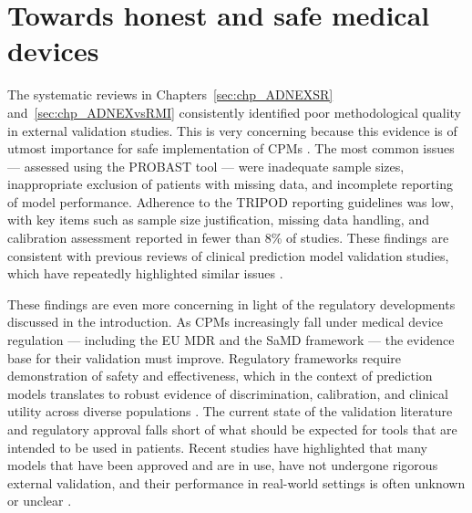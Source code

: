 \section{Towards honest and safe medical devices}

The systematic reviews in Chapters~\ref{sec:chp_ADNEXSR} and~\ref{sec:chp_ADNEXvsRMI} consistently identified poor methodological quality in external validation studies. This is very concerning because this evidence is of utmost importance for safe implementation of \glspl{CPM} \cite{steyerbergPredictionModelsNeed2016}.  The most common issues --- assessed using the \gls{PROBAST} tool \cite{wolffPROBASTToolAssess2019} --- were inadequate sample sizes, inappropriate exclusion of patients with missing data, and incomplete reporting of model performance. Adherence to the \gls{TRIPOD} reporting guidelines \cite{collinsTRIPODAIStatementUpdated2024} was low, with key items such as sample size justification, missing data handling, and calibration assessment reported in fewer than 8\% of studies. These findings are consistent with previous reviews of clinical prediction model validation studies, which have repeatedly highlighted similar issues \cite{collinsExternalValidationMultivariable2014, bouwmeesterReportingMethodsClinical2012, andaurnavarroCompletenessReportingClinical2022,andaurnavarroSystematicReviewFinds2023, andaurnavarroSystematicReviewIdentifies2023, dhimanMethodologicalConductPrognostic2022, dhimanOverinterpretationFindingsMachine2023}.

These findings are even more concerning in light of the regulatory developments discussed in the introduction. As \glspl{CPM} increasingly fall under medical device regulation --- including the EU \gls{MDR} and the \gls{SaMD} framework --- the evidence base for their validation must improve. Regulatory frameworks require demonstration of safety and effectiveness, which in the context of prediction models translates to robust evidence of discrimination, calibration, and clinical utility across diverse populations \cite{vancalsterPerformanceEvaluationPredictive2024, collinsTRIPODAIStatementUpdated2024}. The current state of the validation literature and regulatory approval falls short of what should be expected for tools that are intended to be used in patients. Recent studies have highlighted that many models that have been approved and are in use, have not undergone rigorous external validation, and their performance in real-world settings is often unknown or unclear \cite{mehtaEvaluatingTransparencyAI2025,vanleeuwenArtificialIntelligenceRadiology2021}.

